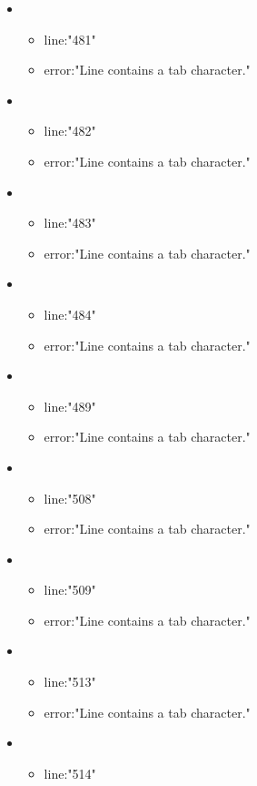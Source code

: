 \begin{itemize}
	\item 
	\begin{itemize} 
		\item line:"481" 
		\item error:"Line contains a tab character." 
	\end{itemize}
	\item 
	\begin{itemize} 
		\item line:"482" 
		\item error:"Line contains a tab character." 
	\end{itemize}
	\item 
	\begin{itemize} 
		\item line:"483" 
		\item error:"Line contains a tab character." 
	\end{itemize}
	\item 
	\begin{itemize} 
		\item line:"484" 
		\item error:"Line contains a tab character." 
	\end{itemize}
	\item 
	\begin{itemize} 
		\item line:"489" 
		\item error:"Line contains a tab character." 
	\end{itemize}
	\item 
	\begin{itemize} 
		\item line:"508" 
		\item error:"Line contains a tab character." 
	\end{itemize}
	\item 
	\begin{itemize} 
		\item line:"509" 
		\item error:"Line contains a tab character." 
	\end{itemize}
	\item 
	\begin{itemize} 
		\item line:"513" 
		\item error:"Line contains a tab character." 
	\end{itemize}
	\item 
	\begin{itemize} 
		\item line:"514" 

\end{itemize}
\end{itemize}
